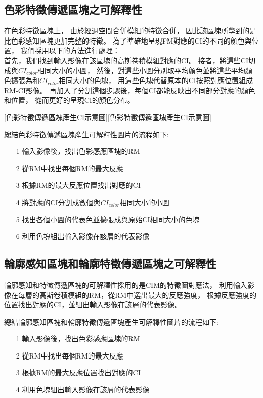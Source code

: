 \documentclass[class=NCU_thesis, crop=false]{standalone}
\begin{document}
	\subsection{色彩特徵傳遞區塊之可解釋性}
	在色彩特徵區塊上，
	由於經過空間合併模組的特徵合併，
	因此該區塊所學到的是比色彩感知區塊更加完整的特徵。
	為了準確地呈現FM對應的CI的不同的顏色與位置，
	我們採用以下的方法進行處理：\\
	首先，我們找到輸入影像在該區塊的高斯卷積模組對應的CI。
	接者，將這些CI切成與$CI_{color}$相同大小的小圖，
	然後，對這些小圖分別取平均顏色並將這些平均顏色擴張為和$CI_{color}$相同大小的色塊，
	用這些色塊代替原本的CI按照對應位置組成RM-CI影像。
	再加入了分割這個步驟後，每個CI都能反映出不同部分對應的顏色和位置，
	從而更好的呈現CI的顏色分布。

	[色彩特徵傳遞區塊產生CI示意圖][色彩特徵傳遞區塊產生CI示意圖]

	總結色彩特徵傳遞區塊產生可解釋性圖片的流程如下:
	\begin{itemize}
		\item [1]
		輸入影像後，找出色彩感應區塊的RM
		\item [2]
		從RM中找出每個RM的最大反應
		\item [3]
		根據RM的最大反應位置找出對應的CI
		\item [4]
		將對應的CI分割成數個與$CI_{color}$相同大小的小圖
		\item [5]
		找出各個小圖的代表色並擴張成與原始CI相同大小的色塊
		\item [6]
		利用色塊組出輸入影像在該層的代表影像
	\end{itemize}

	\subsection{輪廓感知區塊和輪廓特徵傳遞區塊之可解釋性}
	輪廓感知和特徵傳遞區塊的可解釋性採用的是CIM的特徵圖對應法，
	利用輸入影像在每層的高斯卷積模組的RM，從RM中選出最大的反應強度，
	根據反應強度的位置找出對應的CI，並組出輸入影像在該層的代表影像。

	總結輪廓感知區塊和輪廓特徵傳遞區塊產生可解釋性圖片的流程如下:
	\begin{itemize}
		\item [1]
		輸入影像後，找出色彩感應區塊的RM
		\item [2]
		從RM中找出每個RM的最大反應
		\item [3]
		根據RM的最大反應位置找出對應的CI
		\item [4]
		利用色塊組出輸入影像在該層的代表影像
	\end{itemize}
\end{document}
